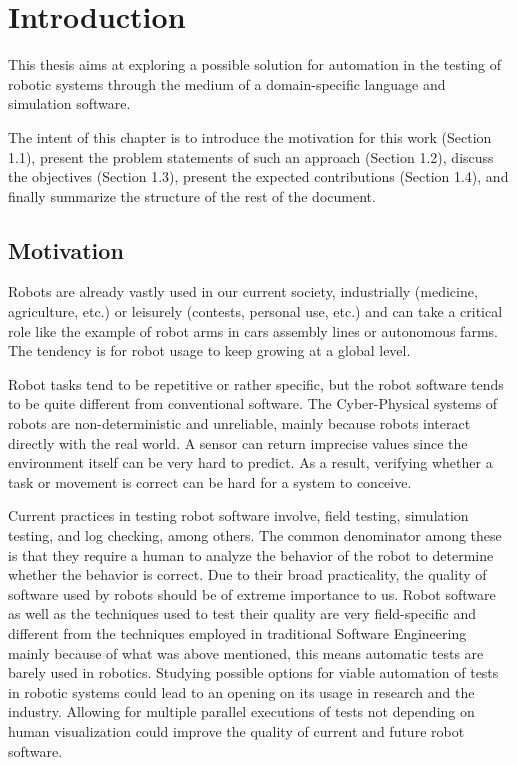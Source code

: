 \chapter{Introduction}
\label{chap:introduction}

This thesis aims at exploring a possible solution for automation in the testing of robotic systems through the medium of a domain-specific language and simulation software.

The intent of this chapter is to introduce the motivation for this work (Section 1.1), present the problem statements of such an approach (Section 1.2), discuss the objectives (Section 1.3), present the expected contributions (Section 1.4), and finally summarize the structure of the rest of the document.


\section{Motivation}
\label{sec:motivation}

Robots are already vastly used in our current society, industrially (medicine, agriculture, etc.) or leisurely (contests, personal use, etc.) and can take a critical role like the example of robot arms in cars assembly lines or autonomous farms. The tendency is for robot usage to keep growing at a global level. 

Robot tasks tend to be repetitive or rather specific, but the robot software tends to be quite different from conventional software. The Cyber-Physical systems of robots are non-deterministic and unreliable, mainly because robots interact directly with the real world. A sensor can return imprecise values since the environment itself can be very hard to predict. As a result, verifying whether a task or movement is correct can be hard for a system to conceive.

Current practices in testing robot software involve, field testing, simulation testing, and log checking, among others. The common denominator among these is that they require a human to analyze the behavior of the robot to determine whether the behavior is correct. Due to their broad practicality, the quality of software used by robots should be of extreme importance to us. Robot software as well as the techniques used to test their quality are very field-specific and different from the techniques employed in traditional Software Engineering mainly because of what was above mentioned, this means automatic tests are barely used in robotics. Studying possible options for viable automation of tests in robotic systems could lead to an opening on its usage in research and the industry. Allowing for multiple parallel executions of tests not depending on human visualization could improve the quality of current and future robot software.


